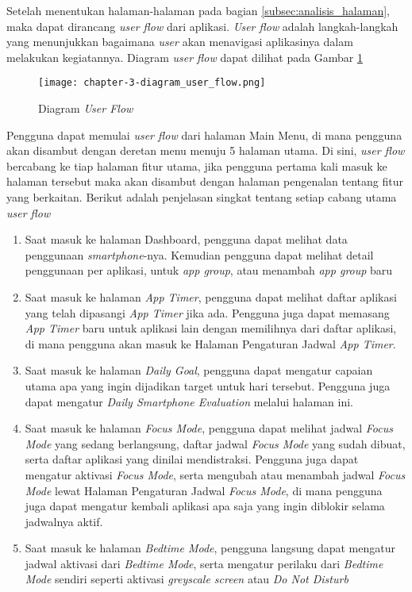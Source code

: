 Setelah menentukan halaman-halaman pada bagian \ref{subsec:analisis_halaman}, maka dapat dirancang \textit{user flow} dari aplikasi. \textit{User flow} adalah langkah-langkah yang menunjukkan bagaimana \textit{user} akan menavigasi aplikasinya dalam melakukan kegiatannya. Diagram \textit{user flow} dapat dilihat pada Gambar \ref{fig:diagram_user_flow}  

\begin{figure}[h]
  \centering
  \texttt{[image: chapter-3-diagram\_user\_flow.png]}
  \caption{Diagram \textit{User Flow}}
  \label{fig:diagram_user_flow}
\end{figure}
\FloatBarrier

Pengguna dapat memulai \textit{user flow} dari halaman Main Menu, di mana pengguna akan disambut dengan deretan menu menuju 5 halaman utama. Di sini, \textit{user flow} bercabang ke tiap halaman fitur utama, jika pengguna pertama kali masuk ke halaman tersebut maka akan disambut dengan halaman pengenalan tentang fitur yang berkaitan. Berikut adalah penjelasan singkat tentang setiap cabang utama \textit{user flow}

\begin{enumerate}
  \item Saat masuk ke halaman Dashboard, pengguna dapat melihat data penggunaan \textit{smartphone}-nya. Kemudian pengguna dapat melihat detail penggunaan per aplikasi, untuk \textit{app group}, atau menambah \textit{app group} baru
  \item Saat masuk ke halaman \textit{App Timer}, pengguna dapat melihat daftar aplikasi yang telah dipasangi \textit{App Timer} jika ada. Pengguna juga dapat memasang \textit{App Timer} baru untuk aplikasi lain dengan memilihnya dari daftar aplikasi, di mana pengguna akan masuk ke Halaman Pengaturan Jadwal \textit{App Timer}.
  \item Saat masuk ke halaman \textit{Daily Goal}, pengguna dapat mengatur capaian utama apa yang ingin dijadikan target untuk hari tersebut. Pengguna juga dapat mengatur \textit{Daily Smartphone Evaluation} melalui halaman ini.
  \item Saat masuk ke halaman \textit{Focus Mode}, pengguna dapat melihat jadwal \textit{Focus Mode} yang sedang berlangsung, daftar jadwal \textit{Focus Mode} yang sudah dibuat, serta daftar aplikasi yang dinilai mendistraksi. Pengguna juga dapat mengatur aktivasi \textit{Focus Mode}, serta mengubah atau menambah jadwal \textit{Focus Mode} lewat Halaman Pengaturan Jadwal \textit{Focus Mode}, di mana pengguna juga dapat mengatur kembali aplikasi apa saja yang ingin diblokir selama jadwalnya aktif.
  \item Saat masuk ke halaman \textit{Bedtime Mode}, pengguna langsung dapat mengatur jadwal aktivasi dari \textit{Bedtime Mode}, serta mengatur perilaku dari \textit{Bedtime Mode} sendiri seperti aktivasi \textit{greyscale screen} atau \textit{Do Not Disturb}
\end{enumerate}

